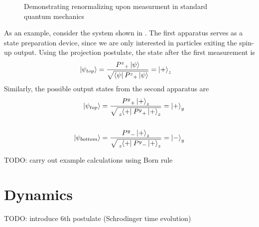 \begin{figure}
\centering\CaptionFontSize
{}
\caption[Insert an abbreviated caption here to show in the List of Figures]
{Demonstrating renormalizing upon measurment in standard quantum mechanics}
\label{Figure:Measurement:Renormalizing}
\end{figure}

As an example, consider the system shown in . The first apparatus serves as a state preparation device, since we are only interested in particles exiting the spin-up output. Using the projection postulate, the state after the first measurement is
\begin{align}
    \ket{\psi_{top}} &= \frac{{P^z}_+\ket{\psi}}{\sqrt{\bra{\psi}{P^z}_+\ket{\psi}}} = \ket{+}_z
\end{align}
Similarly, the possible output states from the second apparatus are
\begin{align}
    \ket{\psi_{top}} &= \frac{{P^y}_+\ket{+}_z}{\sqrt{\tensor[_z]{\bra{+}}{}{P^y}_+\ket{+}_z}} = \ket{+}_y \\ \\
    \ket{\psi_{bottom}} &= \frac{{P^y}_-\ket{+}_z}{\sqrt{\tensor[_z]{\bra{+}}{}{P^y}_-\ket{+}_z}} = \ket{-}_y
\end{align}

TODO: carry out example calculations using Born rule

\section{Dynamics}
TODO: introduce 6th postulate (Schrodinger time evolution)

